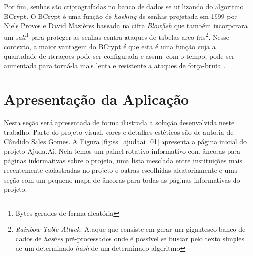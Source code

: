 Por fim, senhas são criptografadas no banco de dados se utilizando do algoritmo BCrypt. O BCrypt é uma função de \emph{hashing} de senhas projetada em 1999 por Niels Provos e David Mazières baseada na cifra \emph{Blowfish} que também incorporara um \emph{salt}\footnote{Bytes gerados de forma aleatória} para proteger as senhas contra ataques de tabelas arco-íris\footnote{\emph{Rainbow Table Attack}: Ataque que consiste em gerar um gigantesco banco de dados de \emph{hashes} pré-processados onde é possível se buscar pelo texto simples de um determinado \emph{hash} de um determinado algoritmo}. Nesse contexto, a maior vantagem do BCrypt é que esta é uma função cuja a quantidade de iterações pode ser configurada e assim, com o tempo, pode ser aumentada para torná-la mais lenta e resistente a ataques de força-bruta \cite{wiki:Bcrypt}.





\section{Apresentação da Aplicação} \label{sec:ajudaai:apresentacao}

Nesta seção será apresentada de forma ilustrada a solução desenvolvida neste trabalho. Parte do projeto visual, cores e detalhes estéticos são de autoria de Cândido Sales Gomes. A Figura \ref{fig:ss_ajudaai_01} apresenta a página inicial do projeto Ajuda.Ai. Nela temos um painel rotativo informativo com âncoras para páginas informativas sobre o projeto, uma lista mesclada entre instituições mais recentemente cadastradas no projeto e outras escolhidas aleatoriamente e uma seção com um pequeno mapa de âncoras para todas as páginas informativas do projeto.

